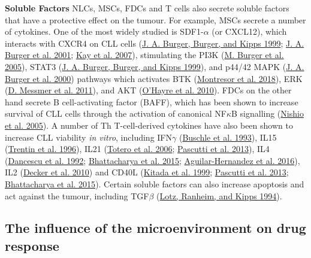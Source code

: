 \documentclass[11pt, a4paper, twosided]{book}
\begin{document}
\textbf{Soluble Factors}
NLCs, MSCs, FDCs and T cells also secrete soluble factors that have a protective effect on the tumour. For example, MSCs secrete a number of cytokines. One of the most widely studied is SDF1-\(\alpha\) (or CXCL12), which interacts with CXCR4 on CLL cells (\protect\hyperlink{ref-Burger1999}{J. A. Burger, Burger, and Kipps 1999}; \protect\hyperlink{ref-Burger2001}{J. A. Burger et al. 2001}; \protect\hyperlink{ref-Kay2007}{Kay et al. 2007}), stimulating the PI3K (\protect\hyperlink{ref-Burger2005}{M. Burger et al. 2005}), STAT3 (\protect\hyperlink{ref-Burger1999}{J. A. Burger, Burger, and Kipps 1999}), and p44/42 MAPK (\protect\hyperlink{ref-Burger2000}{J. A. Burger et al. 2000}) pathways which activates BTK (\protect\hyperlink{ref-Montresor2018}{Montresor et al. 2018}), ERK (\protect\hyperlink{ref-Messmer2011}{D. Messmer et al. 2011}), and AKT (\protect\hyperlink{ref-OHayre2010}{O'Hayre et al. 2010}). FDCs on the other hand secrete B cell-activating factor (BAFF), which has been shown to increase survival of CLL cells through the activation of canonical NF\(\kappa\)B signalling (\protect\hyperlink{ref-Nishio2005}{Nishio et al. 2005}). A number of Th T-cell-derived cytokines have also been shown to increase CLL viability \emph{in vitro}, including IFN\(\gamma\) (\protect\hyperlink{ref-Buschle1993}{Buschle et al. 1993}), IL15 (\protect\hyperlink{ref-Trentin1996}{Trentin et al. 1996}), IL21 (\protect\hyperlink{ref-deTotero2006}{Totero et al. 2006}; \protect\hyperlink{ref-Pascutti2013}{Pascutti et al. 2013}), IL4 (\protect\hyperlink{ref-Dancescu1992}{Dancescu et al. 1992}; \protect\hyperlink{ref-Bhattacharya2015}{Bhattacharya et al. 2015}; \protect\hyperlink{ref-AguilarHernandez2016}{Aguilar-Hernandez et al. 2016}), IL2 (\protect\hyperlink{ref-Decker2010}{Decker et al. 2010}) and CD40L (\protect\hyperlink{ref-Kitada1999}{Kitada et al. 1999}; \protect\hyperlink{ref-Pascutti2013}{Pascutti et al. 2013}; \protect\hyperlink{ref-Bhattacharya2015}{Bhattacharya et al. 2015}). Certain soluble factors can also increase apoptosis and act against the tumour, including TGF\(\beta\) (\protect\hyperlink{ref-Lotz1994}{Lotz, Ranheim, and Kipps 1994}).

\hypertarget{intro-microenvironment-drug-response}{%
\subsection{The influence of the microenvironment on drug response}\label{intro-microenvironment-drug-response}}
\end{document}
